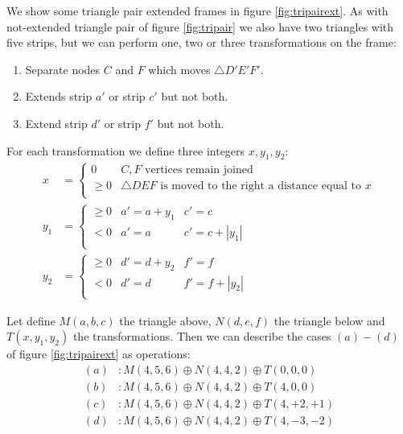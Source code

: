 \documentclass[11pt]{article}
\begin{document}
We show some triangle pair extended frames in figure \ref{fig:tripairext}.
As with not-extended triangle pair of figure \ref{fig:tripair} we also have two triangles with five strips, but we can perform one, two or three transformations on the frame: 
\begin{enumerate}
 \item Separate nodes $C$ and $F$ which moves $\triangle{D'E'F'}$.
 \item Extends strip $a'$ or strip $c'$ but not both.
 \item Extend strip $d'$ or strip $f'$ but not both.
\end{enumerate}

For each transformation we define three integers $x, y_1, y_2$:
\begin{align}
x &= \left \{ \begin{array}{rl}
 0       & C,F \mbox{ vertices remain joined}\\
 \geq  0 & \triangle{DEF} \mbox{ is moved to the right a distance equal to } x \\
 \end{array}\right. \\
y_1 &= \left \{ \begin{array}{rll}
 \geq 0 & a' = a + y_1 & c' = c \\
 < 0 & a' = a          & c' = c + |y_1| \\
 \end{array}\right. \\ 
y_2 &= \left \{ \begin{array}{rll}
 \geq 0 & d' = d + y_2 & f' = f \\
 < 0 & d' = d          & f' = f + |y_2| \\
 \end{array}\right. 
\end{align}

Let define $M(a,b,c)$ the triangle above, $N(d,e,f)$ the triangle below and $T(x,y_1,y_2)$ the transformations.
Then we can describe the cases $(a)-(d)$ of figure \ref{fig:tripairext} as operations:
\begin{align*}
(a) &: M(4,5,6) \oplus N(4,4,2) \oplus T(0,0,0) \\
(b) &: M(4,5,6) \oplus N(4,4,2) \oplus T(4,0,0) \\
(c) &: M(4,5,6) \oplus N(4,4,2) \oplus T(4,+2,+1) \\
(d) &: M(4,5,6) \oplus N(4,4,2) \oplus T(4,-3,-2)
\end{align*}
\end{document}
